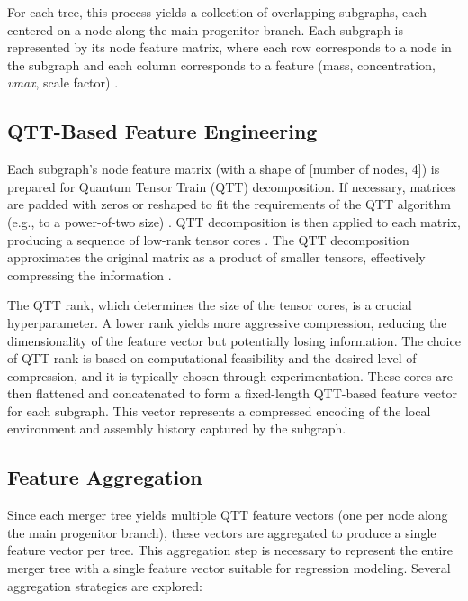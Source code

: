 \documentclass[twocolumn]{aastex631}
\begin{document}
For each tree, this process yields a collection of overlapping subgraphs, each centered on a node along the main progenitor branch. Each subgraph is represented by its node feature matrix, where each row corresponds to a node in the subgraph and each column corresponds to a feature (mass, concentration, \textit{vmax}, scale factor) \citep{ji2024graphicalmultifidelitygaussianprocess}.

\subsection{QTT-Based Feature Engineering}
Each subgraph's node feature matrix (with a shape of [number of nodes, 4]) is prepared for Quantum Tensor Train (QTT) decomposition. If necessary, matrices are padded with zeros or reshaped to fit the requirements of the QTT algorithm (e.g., to a power-of-two size) \citep{matveev2024estimatesquantizedtensortrain}. QTT decomposition is then applied to each matrix, producing a sequence of low-rank tensor cores \citep{bharadwaj2024efficientleveragescoresampling,matveev2024estimatesquantizedtensortrain}. The QTT decomposition approximates the original matrix as a product of smaller tensors, effectively compressing the information \citep{erpenbeck2023tensortraincontinuoustime,matveev2024estimatesquantizedtensortrain}.

The QTT rank, which determines the size of the tensor cores, is a crucial hyperparameter. A lower rank yields more aggressive compression, reducing the dimensionality of the feature vector but potentially losing information. The choice of QTT rank is based on computational feasibility and the desired level of compression, and it is typically chosen through experimentation. These cores are then flattened and concatenated to form a fixed-length QTT-based feature vector for each subgraph. This vector represents a compressed encoding of the local environment and assembly history captured by the subgraph.

\subsection{Feature Aggregation}
Since each merger tree yields multiple QTT feature vectors (one per node along the main progenitor branch), these vectors are aggregated to produce a single feature vector per tree. This aggregation step is necessary to represent the entire merger tree with a single feature vector suitable for regression modeling. Several aggregation strategies are explored:
\end{document}
